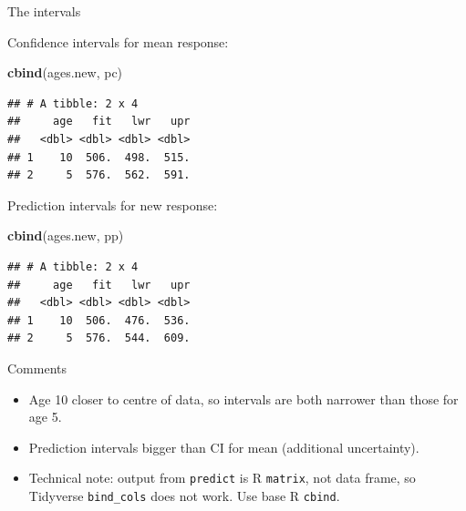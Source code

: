 \documentclass[
  ignorenonframetext,
]{beamer}
\newenvironment{Shaded}{\begin{snugshade}}{\end{snugshade}}
\newcommand{\KeywordTok}[1]{\textcolor[rgb]{0.13,0.29,0.53}{\textbf{#1}}}
\newcommand{\NormalTok}[1]{#1}
\begin{document}
\begin{frame}[fragile]{The intervals}
\protect\hypertarget{the-intervals}{}

Confidence intervals for mean response:

\begin{Shaded}
\begin{Highlighting}[]
\KeywordTok{cbind}\NormalTok{(ages.new, pc)}
\end{Highlighting}
\end{Shaded}

\begin{verbatim}
## # A tibble: 2 x 4
##     age   fit   lwr   upr
##   <dbl> <dbl> <dbl> <dbl>
## 1    10  506.  498.  515.
## 2     5  576.  562.  591.
\end{verbatim}

Prediction intervals for new response:

\begin{Shaded}
\begin{Highlighting}[]
\KeywordTok{cbind}\NormalTok{(ages.new, pp)}
\end{Highlighting}
\end{Shaded}

\begin{verbatim}
## # A tibble: 2 x 4
##     age   fit   lwr   upr
##   <dbl> <dbl> <dbl> <dbl>
## 1    10  506.  476.  536.
## 2     5  576.  544.  609.
\end{verbatim}

\end{frame}

\begin{frame}[fragile]{Comments}
\protect\hypertarget{comments-1}{}

\begin{itemize}
\item
  Age 10 closer to centre of data, so intervals are both narrower than
  those for age 5.
\item
  Prediction intervals bigger than CI for mean (additional uncertainty).
\item
  Technical note: output from \texttt{predict} is R \texttt{matrix}, not
  data frame, so Tidyverse \texttt{bind\_cols} does not work. Use base R
  \texttt{cbind}.
\end{itemize}

\end{frame}
\end{document}
